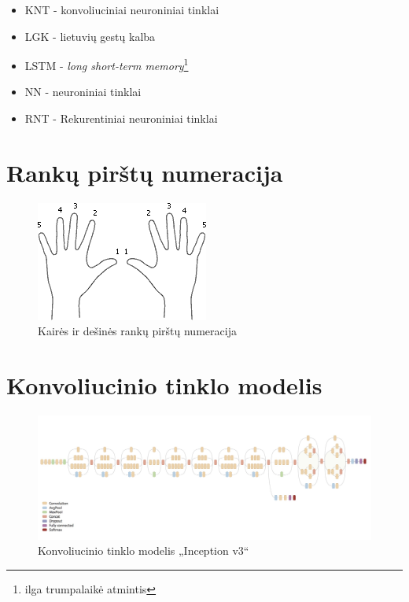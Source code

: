 \documentclass{VUMIFPSbakalaurinis}
\begin{document}
\begin{itemize}
	\item KNT - konvoliuciniai neuroniniai tinklai
	\item LGK - lietuvių gestų kalba
	\item LSTM - \textit{long short-term memory}\footnote{ilga trumpalaikė atmintis}
	\item NN - neuroniniai tinklai
	\item RNT - Rekurentiniai neuroniniai tinklai
\end{itemize}

\appendix  %

\section{Rankų pirštų numeracija}
\label{appendix:pirstai}
\begin{figure}[H]
    \centering
    \includegraphics[scale=1]{img/fingers}
    \caption{Kairės ir dešinės rankų pirštų numeracija}
    \label{img:fingers}
\end{figure}

\section{Konvoliucinio tinklo modelis}
\label{appendix:inception_v3}
\begin{figure}[H]
	\centering
	\includegraphics[scale=0.2]{img/inception_v3}
	\caption{Konvoliucinio tinklo modelis „Inception v3“}
	\label{img:inception_v3}
\end{figure}
\end{document}
